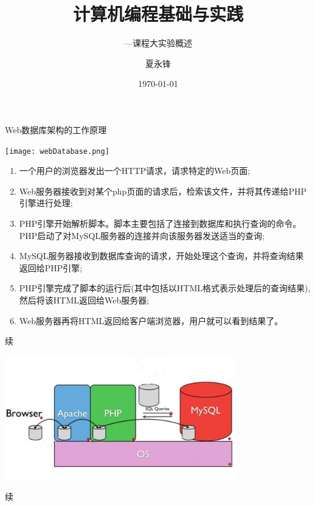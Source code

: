 \documentclass[CJK]{beamer}
\begin{document}
\begin{CJK*}{UTF8}{gbsn}

\title{计算机编程基础与实践}
\subtitle{---课程大实验概述}
\author{夏永锋}
\date{\today}

\begin{frame}
	\titlepage
\end{frame}

\begin{frame}{Web数据库架构的工作原理}
\begin{center}
	\texttt{[image: webDatabase.png]}
\end{center}
{\small
\begin{block}{}
\begin{enumerate}
	\item 一个用户的浏览器发出一个HTTP请求，请求特定的Web页面;
	\item Web服务器接收到对某个php页面的请求后，检索该文件，并将其传递给PHP引擎进行处理;
	\item PHP引擎开始解析脚本。脚本主要包括了连接到数据库和执行查询的命令。PHP启动了对MySQL服务器的连接并向该服务器发送适当的查询;
	\item MySQL服务器接收到数据库查询的请求，开始处理这个查询，并将查询结果返回给PHP引擎;
	\item PHP引擎完成了脚本的运行后(其中包括以HTML格式表示处理后的查询结果),然后将该HTML返回给Web服务器;
	\item Web服务器再将HTML返回给客户端浏览器，用户就可以看到结果了。
\end{enumerate}
\end{block}
}
\end{frame}
\begin{frame}{续}
\begin{center}
	\includegraphics[width=10cm]{AMP.jpg}
\end{center}
\end{frame}
\begin{frame}{续}

\end{frame}
\end{CJK*}
\end{document}
